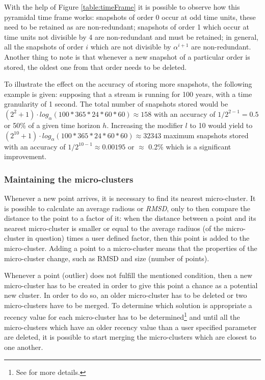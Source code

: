 With the help of Figure \ref{table:timeFrame} it is possible to observe how this pyramidal time frame works: snapshots of order 0 occur at odd time units, these need to be retained as are non-redundant; snapshots of order 1 which occur at time units not divisible by 4 are non-redundant and must be retained; in general, all the snapshots of order $i$ which are not divisible by $\alpha^{i+1}$ are non-redundant. Another thing to note is that whenever a new snapshot of a particular order is stored, the oldest one from that order needs to be deleted.

To illustrate the effect on the accuracy of storing more snapshots, the following example is given: supposing that a stream is running for 100 years, with a time granularity of 1 second. The total number of snapshots stored would be $(2^2 + 1)\cdot log_{\alpha}(100*365*24*60*60) \approx 158$ with an accuracy of $1/ 2^{2-1} = 0.5$ or 50\% of a given time horizon $h$. Increasing the modifier $l$ to 10 would yield to $(2^{10} + 1)\cdot log_{\alpha}(100*365*24*60*60) \approx 32343$ maximum snapshots stored with an accuracy of $1/ 2^{10-1} \approx 0.00195$ or $\approx$ 0.2\% which is a significant improvement.

\subsubsection{Maintaining the micro-clusters}

Whenever a new point arrives, it is necessary to find its nearest micro-cluster. It is possible to calculate an average radious or \textit{RMSD}, only to then compare the distance to the point to a factor of it: when the distance between a point and its nearest micro-cluster is smaller or equal to the average radiuos (of the micro-cluster in question) times a user defined factor, then this point is added to the micro-cluster. Adding a point to a micro-cluster means that the properties of the micro-cluster change, such as RMSD and size (number of points).

Whenever a point (outlier) does not fulfill the mentioned condition, then a new micro-cluster has to be created in order to give this point a chance as a potential new cluster. In order to do so, an older micro-cluster has to be deleted or two micro-clusters have to be merged. To determine which solution is appropriate a recency value for each micro-cluster has to be determined\footnote{See \cite{clustreamOrig} for more details.} and until all the micro-clusters which have an older recency value than a user specified parameter are deleted, it is possible to start merging the micro-clusters which are closest to one another.

